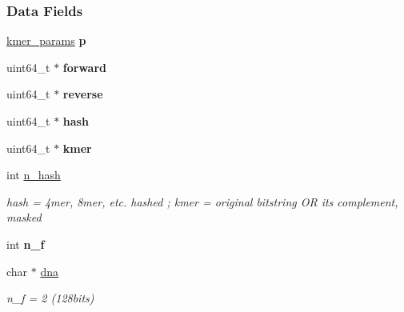 \subsubsection*{Data Fields}
\begin{DoxyCompactItemize}
\item 
\mbox{\label{structkmerhash__struct_a23892ad222dad6a79273beca81e995c0}} 
\hyperlink{structkmer__params__struct}{kmer\+\_\+params} {\bfseries p}
\item 
\mbox{\label{structkmerhash__struct_aa3c9693685126b991f164cec4b4dd7bb}} 
uint64\+\_\+t $\ast$ {\bfseries forward}
\item 
\mbox{\label{structkmerhash__struct_ad902710026c95bd26bd0c1b80d7fcaa3}} 
uint64\+\_\+t $\ast$ {\bfseries reverse}
\item 
\mbox{\label{structkmerhash__struct_a01038ae0a80679f16193b0fefd307463}} 
uint64\+\_\+t $\ast$ {\bfseries hash}
\item 
\mbox{\label{structkmerhash__struct_aadebb3ec22d087df6e871c97226457e9}} 
uint64\+\_\+t $\ast$ {\bfseries kmer}
\item 
\mbox{\label{structkmerhash__struct_a7b70ba55ef5a3b80903d066bf5e541b6}} 
int \hyperlink{structkmerhash__struct_a7b70ba55ef5a3b80903d066bf5e541b6}{n\+\_\+hash}
\begin{DoxyCompactList}\small\item\em hash = 4mer, 8mer, etc. hashed ; kmer = original bitstring OR its complement, masked \end{DoxyCompactList}\item 
\mbox{\label{structkmerhash__struct_a7b19cd31e09a64da9ca9cd23e3818a14}} 
int {\bfseries n\+\_\+f}
\item 
\mbox{\label{structkmerhash__struct_a717c103d70edf2ad4fb7c40442760731}} 
char $\ast$ \hyperlink{structkmerhash__struct_a717c103d70edf2ad4fb7c40442760731}{dna}
\begin{DoxyCompactList}\small\item\em n\+\_\+f = 2 (128bits) \end{DoxyCompactList}\item 

\end{DoxyCompactItemize}
